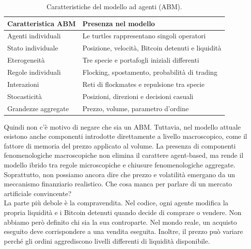 \begin{table}[htbp]
    \centering
    \small
    \renewcommand{\arraystretch}{1.35}

    \begin{tabularx}{\textwidth}{
        @{}
        >{\raggedright\arraybackslash}p{}
        >{\raggedright\arraybackslash}X
        @{}
    }
        \toprule
        \textbf{Caratteristica ABM}
        & \textbf{Presenza nel modello} \\
        \midrule

        Agenti individuali
        & Le turtles rappresentano singoli operatori \\
        \midrule

        Stato individuale
        & Posizione, velocità, Bitcoin detenuti e liquidità \\
        \midrule

        Eterogeneità
        & Tre specie e portafogli iniziali differenti \\
        \midrule

        Regole individuali
        & Flocking, spostamento, probabilità di trading \\
        \midrule

        Interazioni
        & Reti di flockmates e repulsione tra specie \\
        \midrule

        Stocasticità
        & Posizioni, direzioni e decisioni casuali \\
        \midrule

        Grandezze aggregate
        & Prezzo, volume, parametro d'ordine \\

        \bottomrule
    \end{tabularx}

    \caption{Caratteristiche del modello ad agenti (ABM).}
    \label{tab:caratteristiche-abm}
\end{table}

Quindi non c'è motivo di negare che sia un ABM.
Tuttavia, nel modello attuale esistono anche componenti introdotte direttamente a livello macroscopico, come il fattore di memoria del prezzo applicato 
al volume. La presenza di componenti fenomenologiche macroscopiche non elimina il carattere agent-based, ma rende il modello ibrido tra regole 
microscopiche e chiusure fenomenologiche aggregate. Soprattutto, non possiamo ancora dire che prezzo e volatilità emergano da un meccanismo 
finanziario realistico. Che cosa manca per parlare di un mercato artificiale convincente?\\
La parte più debole è la compravendita.
Nel codice, ogni agente modifica la propria liquidità e i Bitcoin detenuti quando decide di comprare o vendere. Non abbiamo però definito chi sia 
la sua controparte. Nel mondo reale, un acquisto eseguito deve corrispondere a una vendita eseguita. Inoltre, il prezzo può variare perché gli 
ordini aggrediscono livelli differenti di liquidità disponibile.










